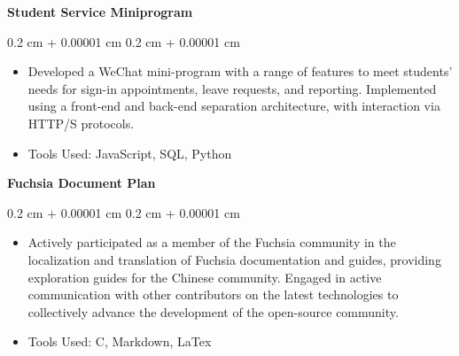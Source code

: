 \documentclass[10pt, letterpaper]{article}
\newenvironment{highlights}{
    \begin{itemize}[
        topsep=0.10 cm,
        parsep=0.10 cm,
        partopsep=0pt,
        itemsep=0pt,
        leftmargin=0.4 cm + 10pt
    ]
}{
    \end{itemize}
} %
\newenvironment{onecolentry}{
    \begin{adjustwidth}{
        0.2 cm + 0.00001 cm
    }{
        0.2 cm + 0.00001 cm
    }
}{
    \end{adjustwidth}
} %
\newenvironment{twocolentry}[2][]{
    \onecolentry
    \def\secondColumn{#2}
    \setcolumnwidth{\fill, 6 cm}
    \begin{paracol}{2}
}{
    \switchcolumn \raggedleft \secondColumn
    \end{paracol}
    \endonecolentry
} %
\let\hrefWithoutArrow\href
\renewcommand{\href}[2]{\hrefWithoutArrow{#1}{\ifthenelse{\equal{#2}{}}{ }{#2 }\raisebox{.15ex}{\footnotesize \faExternalLink*}}}
\begin{document}
        
        \vspace{0.2 cm}
        
            
            
            \textbf{Student Service Miniprogram}

        \vspace{0.10 cm}
        \begin{onecolentry}
            \begin{highlights}
                \item Developed a WeChat mini-program with a range of features to meet students' needs for sign-in appointments, leave requests, and reporting. Implemented using a front-end and back-end separation architecture, with interaction via HTTP/S protocols.
                \item Tools Used: JavaScript, SQL, Python
            \end{highlights}
        \end{onecolentry}


        \vspace{0.2 cm}

            
            
            \textbf{Fuchsia Document Plan}

        \vspace{0.10 cm}
        \begin{onecolentry}
            \begin{highlights}
                \item Actively participated as a member of the Fuchsia community in the localization and translation of Fuchsia documentation and guides, providing exploration guides for the Chinese community. Engaged in active communication with other contributors on the latest technologies to collectively advance the development of the open-source community.
                \item Tools Used: C, Markdown, LaTex
            \end{highlights}
        \end{onecolentry}
\end{document}
